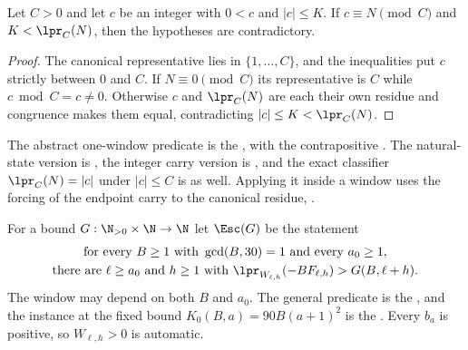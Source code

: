 \begin{proposition}\label{long269:res:consumer}
Let $C>0$ and let $c$ be an integer with $0<c$ and $|c|\le K$.  If
$c\equiv N\pmod C$ and $K<\lpr_C(N)$, then the hypotheses are contradictory.
\end{proposition}

\begin{proof}
The canonical representative lies in $\{1,\ldots,C\}$, and the inequalities put
$c$ strictly between $0$ and $C$.  If $N\equiv0\pmod C$ its representative is
$C$ while $c\bmod C=c\ne0$.  Otherwise $c$ and $\lpr_C(N)$ are each their own
residue and congruence makes them equal, contradicting $|c|\le K<\lpr_C(N)$.
\end{proof}

\noindent The abstract one-window predicate is the
, with the contrapositive
.  The natural-state version is
,
the integer carry version is
,
and the exact classifier $\lpr_C(N)=|c|$ under $|c|\le C$ is
as well.  Applying it inside a window uses the forcing of the endpoint carry to
the canonical residue,
.

For a bound $G:\N_{>0}\times\N\to\N$ let $\Esc(G)$ be the statement
\begin{equation}\label{long269:eq:actual-escape}
 \begin{gathered}
 \text{for every }B\ge1\text{ with }\gcd(B,30)=1\text{ and every }a_0\ge1,\\
 \text{there are }\ell\ge a_0\text{ and }h\ge1\text{ with }
 \lpr_{W_{\ell,h}}(-BF_{\ell,h})>G(B,\ell+h) .
 \end{gathered}
\end{equation}
The window may depend on both $B$ and $a_0$.  The general predicate is the
, and the instance at the fixed bound
$K_0(B,a)=90B(a+1)^{2}$ is the
.  Every $b_a$ is positive, so $W_{\ell,h}>0$ is automatic.

